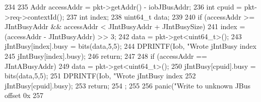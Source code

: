 \begin{DoxyCode}
234 {
235         Addr accessAddr = pkt->getAddr() - iobJBusAddr;
236         int cpuid = pkt->req->contextId();
237         int index;
238         uint64_t data;
239 
240         if (accessAddr >= JIntBusyAddr && accessAddr < JIntBusyAddr + 
      JIntBusySize) {
241             index = (accessAddr - JIntBusyAddr) >> 3;
242             data = pkt->get<uint64_t>();
243             jIntBusy[index].busy = bits(data,5,5);
244             DPRINTF(Iob, "Wrote jIntBusy index %
245                     jIntBusy[index].busy);
246             return;
247         }
248         if (accessAddr == JIntABusyAddr) {
249             data = pkt->get<uint64_t>();
250             jIntBusy[cpuid].busy = bits(data,5,5);
251             DPRINTF(Iob, "Wrote jIntBusy index %
252                     jIntBusy[cpuid].busy);
253             return;
254         };
255 
256         panic("Write to unknown JBus offset 0x%
257 }
\end{DoxyCode}


